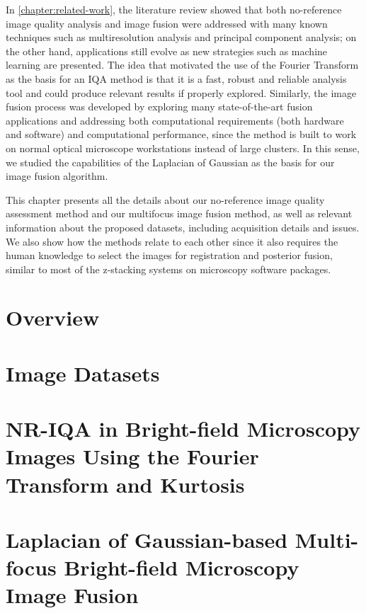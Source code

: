 In \autoref{chapter:related-work}, the literature review showed that both no-reference image quality analysis and image fusion were addressed with many known techniques such as multiresolution analysis and principal component analysis; on the other hand, applications still evolve as new strategies such as machine learning are presented. The idea that motivated the use of the Fourier Transform as the basis for an IQA method is that it is a fast, robust and reliable analysis tool and could produce relevant results if properly explored. Similarly, the image fusion process was developed by exploring many state-of-the-art fusion applications and addressing both computational requirements (both hardware and software) and computational performance, since the method is built to work on normal optical microscope workstations instead of large clusters. In this sense, we studied the capabilities of the Laplacian of Gaussian as the basis for our image fusion algorithm. 

This chapter presents all the details about our no-reference image quality assessment method and our multifocus image fusion method, as well as relevant information about the proposed datasets, including acquisition details and issues. We also show how the methods relate to each other since it also requires the human knowledge to select the images for registration and posterior fusion, similar to most of the z-stacking systems on microscopy software packages.

\section{Overview}


\section{Image Datasets}


\section{NR-IQA in Bright-field Microscopy Images Using the Fourier Transform and Kurtosis}


\section{Laplacian of Gaussian-based Multi-focus Bright-field Microscopy Image Fusion}

